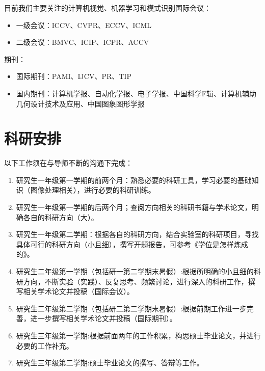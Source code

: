\documentclass[a4paper，12pt]{article}
\begin{document}
目前我们主要关注的计算机视觉、机器学习和模式识别国际会议：

\begin{itemize}

\item 一级会议：ICCV、CVPR、ECCV、ICML

\item 二级会议：BMVC、ICIP、ICPR、ACCV

\end{itemize}

期刊：

\begin{itemize}

\item 国际期刊：PAMI、IJCV、PR、TIP

\item 国内期刊：计算机学报、自动化学报、电子学报、中国科学F辑、计算机辅助几何设计技术及应用、中国图象图形学报

\end{itemize}

\section{科研安排}

以下工作须在与导师不断的沟通下完成：

\begin{enumerate}

\item 研究生一年级第一学期的前两个月：熟悉必要的科研工具，学习必要的基础知识（图像处理相关），进行必要的科研训练。

\item 研究生一年级第一学期的后两个月；查阅方向相关的科研书籍与学术论文，明确各自的科研方向（大）。

\item 研究生一年级第二学期：根据各自的科研方向，结合实验室的科研项目，寻找具体可行的科研方向（小且细），撰写开题报告，可参考《学位是怎样炼成的》。

\item 研究生二年级第一学期（包括研一第二学期末暑假）:根据所明确的小且细的科研方向，不断实验（实践）、反复思考、频繁讨论，进行深入的科研工作，撰写相关学术论文并投稿（国际会议）。

\item 研究生二年级第二学期（包括研二第二学期末暑假）:根据前期工作进一步完善，进一步撰写相关学术论文并投稿（国际期刊）。

\item 研究生三年级第一学期:根据前面两年的工作积累，构思硕士毕业论文，并进行必要的工作补充。

\item 研究生三年级第二学期:硕士毕业论文的撰写、答辩等工作。

\end{enumerate}
\end{document}
